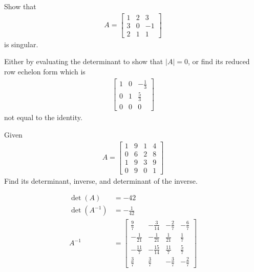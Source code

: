 \begin{Exercise}
Show that
\begin{align*}
A = 
\begin{bmatrix}
1 & 2 & 3 \\
3 & 0 & -1 \\
2 & 1 & 1 
\end{bmatrix}
\end{align*}
is singular.
\end{Exercise}
\begin{Answer}
Either by evaluating the determinant to show that $|A| = 0$, or find its reduced row echelon form which is
\begin{align*}
\begin{bmatrix}
1 & 0 & -\frac{1}{3} \\
0 & 1 & \frac{5}{3} \\
0 & 0 & 0
\end{bmatrix}
\end{align*}
not equal to the identity.
\end{Answer}

\begin{Exercise}
Given
\begin{align*}
A =
\begin{bmatrix}
1 & 9 & 1 & 4\\
0 & 6 & 2 & 8\\
1 & 9 & 3 & 9\\
0 & 9 & 0 & 1
\end{bmatrix}  
\end{align*}
Find its determinant, inverse, and determinant of the inverse. 
\end{Exercise}
\begin{Answer}
\begin{align*}
\det(A) &= -42\\
\det(A^{-1}) &= -\frac{1}{42}\\
A^{-1} &= 
\begin{bmatrix}
\frac{9}{7} & -\frac{3}{14} & -\frac{2}{7} & -\frac{6}{7} \\
-\frac{1}{21} & -\frac{1}{21} & \frac{1}{21} & \frac{1}{7} \\
-\frac{11}{7} & -\frac{15}{14} & \frac{11}{7} & \frac{5}{7} \\
\frac{3}{7} & \frac{3}{7} & -\frac{3}{7} & -\frac{2}{7}
\end{bmatrix}
\end{align*}
\end{Answer}

